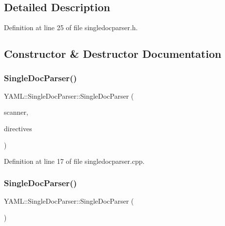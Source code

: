 \subsection{Detailed Description}


Definition at line 25 of file singledocparser.\+h.



\subsection{Constructor \& Destructor Documentation}
\mbox{\label{class_y_a_m_l_1_1_single_doc_parser_a114cc1fd77d12561496de09e742958dc}} 
\subsubsection{\texorpdfstring{SingleDocParser()}{SingleDocParser()}\hspace{0.1cm}{\footnotesize\ttfamily [1/3]}}
{\footnotesize\ttfamily Y\+A\+M\+L\+::\+Single\+Doc\+Parser\+::\+Single\+Doc\+Parser (\begin{DoxyParamCaption}\item[{\mbox{\hyperlink{class_y_a_m_l_1_1_scanner}{Scanner}} \&}]{scanner,  }\item[{const \mbox{\hyperlink{struct_y_a_m_l_1_1_directives}{Directives}} \&}]{directives }\end{DoxyParamCaption})}



Definition at line 17 of file singledocparser.\+cpp.

\mbox{\label{class_y_a_m_l_1_1_single_doc_parser_ab4ff96c5ae000df0bfa1eae72cdfc6e9}} 
\subsubsection{\texorpdfstring{SingleDocParser()}{SingleDocParser()}\hspace{0.1cm}{\footnotesize\ttfamily [2/3]}}
{\footnotesize\ttfamily Y\+A\+M\+L\+::\+Single\+Doc\+Parser\+::\+Single\+Doc\+Parser (\begin{DoxyParamCaption}\item[{const \mbox{\hyperlink{class_y_a_m_l_1_1_single_doc_parser}{Single\+Doc\+Parser}} \&}]{ }\end{DoxyParamCaption})\hspace{0.3cm}{\ttfamily [delete]}}

